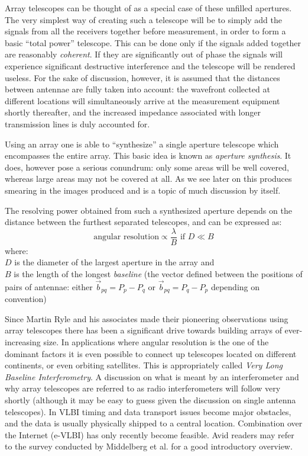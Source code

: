 Array telescopes can be thought of as a special case of these unfilled apertures. The very simplest way of creating such
a telescope will be to simply add the signals from all the receivers together before measurement, in order to form a 
basic ``total power'' telescope. This can be done only if the signals added together are reasonably \textit{coherent}. If they
are significantly out of phase the signals will experience significant destructive interference and the telescope will be
rendered useless. For the sake of discussion, however, it is assumed that the distances between antennae are fully taken 
into account: the wavefront collected at different locations will simultaneously arrive at the measurement equipment shortly 
thereafter, and the increased impedance associated with longer transmission lines is duly accounted for.

Using an array one is able to ``synthesize'' a single aperture telescope which encompasses the entire array. This
basic idea is known as \textit{aperture synthesis}. It does, however pose a serious conundrum: only some areas will be well covered, whereas
large areas may not be covered at all. As we see later on this produces smearing in the images produced and is a topic of much 
discussion by itself.

The resolving power obtained from such a synthesized aperture depends on the distance between the furthest separated 
telescopes, and can be expressed as:
\begin{equation*}
 \text{angular resolution} \propto \frac{\lambda}{B} \text{ if } D\ll B
\end{equation*}
where:\\
$D$ is the diameter of the largest aperture in the array and\\
$B$ is the length of the longest \textit{baseline} (the vector defined between the positions of pairs of antennae: 
either $\vec{b}_{pq}=P_p - P_q$ or $\vec{b}_{pq}=P_q - P_p$ depending on convention)

Since Martin Ryle and his associates made their pioneering observations using array telescopes there has been
a significant drive towards building arrays of ever-increasing size. In applications where angular resolution is
the one of the dominant factors it is even possible to connect up telescopes located on different continents, or even orbiting satellites.
This is appropriately called \textit{Very Long Baseline Interferometry}. A discussion on what is meant by an interferometer 
and why array telescopes are referred to as radio interferometers will follow very shortly (although it may be easy to guess given
the discussion on single antenna telescopes). In VLBI timing and data transport issues become major obstacles, and the data is usually 
physically shipped to a central location. Combination over the Internet (e-VLBI) has only recently become feasible. Avid readers may 
refer to the survey conducted by Middelberg et al. \cite{middelberg2008high} for a good introductory overview.

